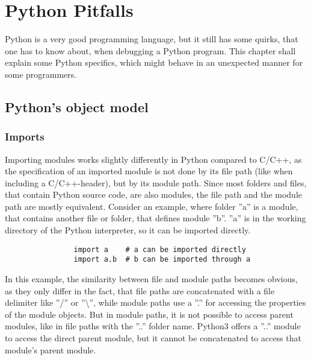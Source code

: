 
\chapter{Python Pitfalls}
	\label{PythonPitfalls}
	Python is a very good programming language, but it still has some quirks, that one has to know about, when debugging a Python program.
	This chapter shall explain some Python specifics, which might behave in an unexpected manner for some programmers.

	\section{Python's object model}
		\subsection{Imports}
			Importing modules works slightly differently in Python compared to C/C++, as the specification of an imported module is not done by its file path (like when including a C/C++-header), but by its module path.
			Since most folders and files, that contain Python source code, are also modules, the file path and the module path are mostly equivalent.
			Consider an example, where folder ''a'' is a module, that contains another file or folder, that defines module ''b''.
			''a'' is in the working directory of the Python interpreter, so it can be imported directly.
			\begin{verbatim}
				import a    # a can be imported directly
				import a.b  # b can be imported through a
			\end{verbatim}
			In this example, the similarity between file and module paths becomes obvious, as they only differ in the fact, that file paths are concatenated with a file delimiter like ''/'' or ''\textbackslash'', while module paths use a ''.'' for accessing the properties of the module objects.
			But in module paths, it is not possible to access parent modules, like in file paths with the ''..'' folder name.
			Python3 offers a ''..'' module to access the direct parent module, but it cannot be concatenated to access that module's parent module.

